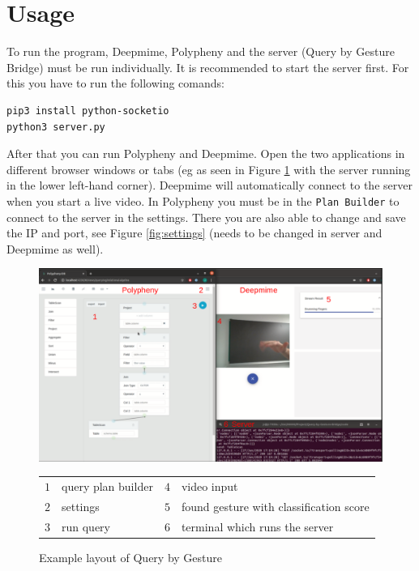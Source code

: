 \section{Usage}
\label{g1:sec:usage}  %

To run the program, Deepmime, Polypheny and the server (Query by Gesture Bridge) must be run individually. It is recommended to start the server first. For this you have to run the following comands:
\begin{lstlisting}
pip3 install python-socketio
python3 server.py
\end{lstlisting}
After that you can run Polypheny and Deepmime. Open the two applications in different browser windows or tabs (eg as seen in Figure \ref{fig:example} with the server running in the lower left-hand corner). 
Deepmime will automatically connect to the server when you start a live video. In Polypheny you must be in the \texttt{Plan Builder} to connect to the server in the settings. There you are also able to change and save the IP and port, see Figure \ref{fig:settings} (needs to be changed in server and Deepmime as well). 
\begin{figure}[H]
    \centering
    \includegraphics[width=\textwidth]{reportContent/images/example.png}
    \caption{Example layout of Query by Gesture}
    \label{fig:example}
    \begin{tabular}{r@{: }l r@{: }l}
    $1$& query plan builder & $4$ & video input \\
    $2$& settings & $5$ & found gesture with classification score\\
    $3$& run query  & $6$& terminal which runs the server 
    \end{tabular}
\end{figure}{}
